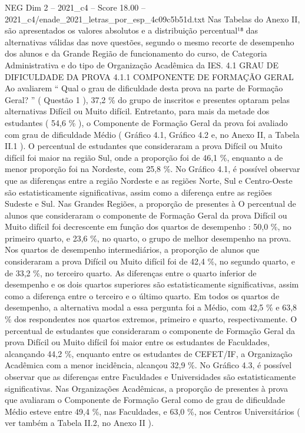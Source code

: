 \begin{textsample}{NEG Dim 2 – 2021\_c4 – Score 18.00 – 2021\_c4/enade\_2021\_letras\_por\_esp\_4c09c5b51d.txt}
Nas Tabelas do Anexo II, são apresentados os valores absolutos e a distribuição percentual¹⁸ das alternativas válidas das nove questões, segundo o mesmo recorte de desempenho dos alunos e da Grande Região de funcionamento do curso, de Categoria Administrativa e do tipo de Organização Acadêmica da IES. 4.1 GRAU DE DIFICULDADE DA PROVA 4.1.1 COMPONENTE DE FORMAÇÃO GERAL Ao avaliarem “ Qual o grau de dificuldade desta prova na parte de Formação Geral? ” ( Questão 1 ), 37,2 \% do grupo de inscritos e presentes optaram pelas alternativas Difícil ou Muito difícil.
Entretanto, para mais da metade dos estudantes ( 54,6 \% ), o Componente de Formação Geral da prova foi avaliado com grau de dificuldade Médio ( Gráfico 4.1, Gráfico 4.2 e, no Anexo II, a Tabela II.1 ).
O percentual de estudantes que consideraram a prova Difícil ou Muito difícil foi maior na região Sul, onde a proporção foi de 46,1 \%, enquanto a de menor proporção foi na Nordeste, com 25,8 \%.
No Gráfico 4.1, é possível observar que as diferenças entre a região Nordeste e as regiões Norte, Sul e Centro-Oeste são estatisticamente significativas, assim como a diferença entre as regiões Sudeste e Sul.
Nas Grandes Regiões, a proporção de presentes à O percentual de alunos que consideraram o componente de Formação Geral da prova Difícil ou Muito difícil foi decrescente em função dos quartos de desempenho : 50,0 \%, no primeiro quarto, e 23,6 \%, no quarto, o grupo de melhor desempenho na prova.
Nos quartos de desempenho intermediários, a proporção de alunos que consideraram a prova Difícil ou Muito difícil foi de 42,4 \%, no segundo quarto, e de 33,2 \%, no terceiro quarto.
As diferenças entre o quarto inferior de desempenho e os dois quartos superiores são estatisticamente significativas, assim como a diferença entre o terceiro e o último quarto.
Em todos os quartos de desempenho, a alternativa modal a essa pergunta foi a Médio, com 42,5 \% e 63,8 \% dos respondentes nos quartos extremos, primeiro e quarto, respectivamente.
O percentual de estudantes que consideraram o componente de Formação Geral da prova Difícil ou Muito difícil foi maior entre os estudantes de Faculdades, alcançando 44,2 \%, enquanto entre os estudantes de CEFET/IF, a Organização Acadêmica com a menor incidência, alcançou 32,9 \%.
No Gráfico 4.3, é possível observar que as diferenças entre Faculdades e Universidades são estatisticamente significativas.
Nas Organizações Acadêmicas, a proporção de presentes à prova que avaliaram o Componente de Formação Geral como de grau de dificuldade Médio esteve entre 49,4 \%, nas Faculdades, e 63,0 \%, nos Centros Universitários ( ver também a Tabela II.2, no Anexo II ).

\end{textsample}
